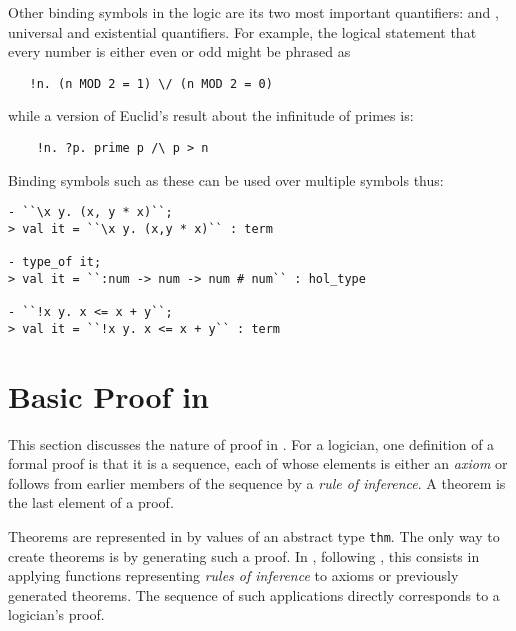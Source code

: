 Other binding symbols in the logic are its two most important quantifiers: \ml{!} and , universal and existential quantifiers.
For example, the logical statement that every number is either even or odd might be phrased as
\begin{verbatim}
   !n. (n MOD 2 = 1) \/ (n MOD 2 = 0)
\end{verbatim}
while a version of Euclid's result about the infinitude of primes is:
\begin{verbatim}
    !n. ?p. prime p /\ p > n
\end{verbatim}
%
Binding symbols such as these can be used over multiple symbols thus:
\begin{session}
\begin{verbatim}
- ``\x y. (x, y * x)``;
> val it = ``\x y. (x,y * x)`` : term

- type_of it;
> val it = ``:num -> num -> num # num`` : hol_type

- ``!x y. x <= x + y``;
> val it = ``!x y. x <= x + y`` : term
\end{verbatim}
\end{session}


\section{Basic Proof in \HOL{}}

\newcommand\tacticline{\hline \hline}
\newenvironment{proofenumerate}{\begin{enumerate}}{\end{enumerate}}

\setcounter{sessioncount}{0}

This section discusses the nature of proof in \HOL{}.
For a logician, one definition of a formal proof is that it is a sequence, each of whose elements is either an {\it axiom\/} or follows from earlier members of the sequence by a {\it rule of inference\/}.
A theorem is the last element of a proof.

Theorems are represented in \HOL{} by values of an abstract type {\small\verb|thm|}.
The only way to create theorems is by generating such a proof.
In \HOL, following \LCF, this consists in applying \ML{} functions representing \emph{rules of inference} to axioms or previously generated theorems.
The sequence of such applications directly corresponds to a logician's proof.

